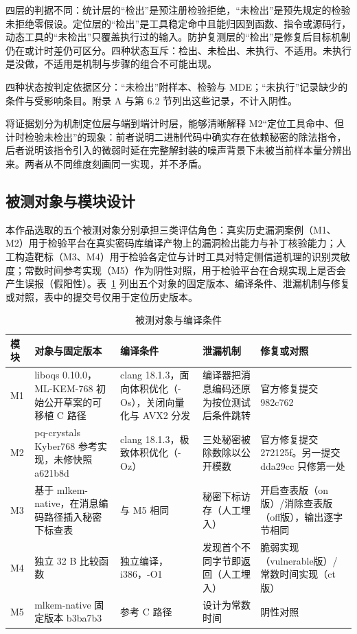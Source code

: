 四层的判据不同：统计层的“检出”是预注册检验拒绝，“未检出”是预先规定的检验未拒绝零假设。定位层的“检出”是工具稳定命中且能归因到函数、指令或源码行，动态工具的“未检出”只覆盖执行过的输入。防护复测层的“检出”是修复后目标机制仍在或计时差仍可区分。四种状态互斥：检出、未检出、未执行、不适用。未执行是没做，不适用是机制与步骤的组合不可能出现。

四种状态按判定依据区分：“未检出”附样本、检验与 MDE；“未执行”记录缺少的条件与受影响条目。附录 A 与第 6.2 节列出这些记录，不计入阴性。

将证据划分为机制定位层与端到端计时层，能够清晰解释 M2“定位工具命中、但计时检验未检出”的现象：前者说明二进制代码中确实存在依赖秘密的除法指令，后者说明该指令引入的微弱时延在完整解封装的噪声背景下未被当前样本量分辨出来。两者从不同维度刻画同一实现，并不矛盾。

\subsection{被测对象与模块设计}

本作品选取的五个被测对象分别承担三类评估角色：真实历史漏洞案例（M1、M2）用于检验平台在真实密码库编译产物上的漏洞检出能力与补丁核验能力；人工构造靶标（M3、M4）用于检验各定位与计时工具对特定侧信道机理的识别灵敏度；常数时间参考实现（M5）作为阴性对照，用于检验平台在合规实现上是否会产生误报（假阳性）。表~\ref{tab:objects} 列出五个对象的固定版本、编译条件、泄漏机制与修复或对照，表中的提交号仅用于定位历史版本。

\begin{table}[H]
\centering
\caption{被测对象与编译条件}
\label{tab:objects}
{\small
\begin{tabularx}{\textwidth}{|>{\raggedright\arraybackslash}p{0.9cm}|>{\raggedright\arraybackslash}X|>{\raggedright\arraybackslash}p{3.4cm}|>{\raggedright\arraybackslash}p{4.2cm}|>{\raggedright\arraybackslash}p{3.3cm}|}
\hline
模块 & 对象与固定版本 & 编译条件 & 泄漏机制 & 修复或对照 \\
\hline
M1 & liboqs 0.10.0，ML-KEM-768 初始公开草案的可移植 C 路径 & clang 18.1.3，面向体积优化（-Os），关闭向量化与 AVX2 分发 & 编译器把消息编码还原为按位测试后条件跳转 & 官方修复提交 982c762 \\
\hline
M2 & pq-crystals Kyber768 参考实现，未修快照 a621b8d & clang 18.1.3，极致体积优化（-Oz） & 三处秘密被除数除以公开模数 & 官方修复提交 272125f。另一提交 dda29cc 只修第一处 \\
\hline
M3 & 基于 mlkem-native，在消息编码路径插入秘密下标查表 & 与 M5 相同 & 秘密下标访存（人工埋入） & 开启查表版（on版）/消除查表版（off版），输出逐字节相同 \\
\hline
M4 & 独立 32 B 比较函数 & 独立编译，i386，-O1 & 发现首个不同字节即返回（人工埋入） & 脆弱实现（vulnerable版）/常数时间实现（ct版） \\
\hline
M5 & mlkem-native 固定版本 b3ba7b3 & 参考 C 路径 & 设计为常数时间 & 阴性对照 \\
\hline
\end{tabularx}
}
\end{table}

